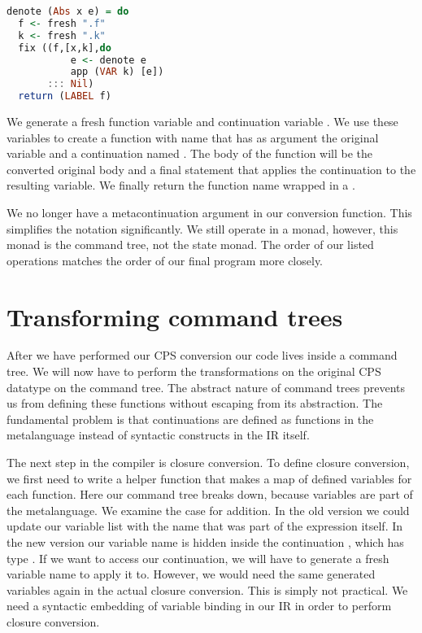 \begin{lstlisting}[language=Haskell]
denote (Abs x e) = do
  f <- fresh ".f"
  k <- fresh ".k"
  fix ((f,[x,k],do
           e <- denote e
           app (VAR k) [e])
       ::: Nil)
  return (LABEL f)
\end{lstlisting}

We generate a fresh function variable  and continuation variable . We use these variables to create a function with name  that has as argument the original variable and a continuation named . The body of the function will be the converted original body and a final statement that applies the continuation to the resulting variable. We finally return the function name wrapped in a .

We no longer have a metacontinuation argument in our conversion function. This simplifies the notation significantly. We still operate in a monad, however, this monad is the command tree, not the state monad. The order of our listed operations matches the order of our final program more closely.


\section{\label{section:transcomtree}Transforming command trees}
After we have performed our \ac{CPS} conversion our code lives inside a command tree. We will now have to perform the transformations on the original \ac{CPS} datatype on the command tree. The abstract nature of command trees prevents us from defining these functions without escaping from its abstraction. The fundamental problem is that continuations are defined as functions in the metalanguage instead of syntactic constructs in the \ac{IR} itself.

The next step in the compiler is closure conversion. To define closure conversion, we first need to write a helper function that makes a map of defined variables for each function. Here our command tree breaks down, because variables are part of the metalanguage. We examine the case for addition. In the old version we could update our variable list with the name  that was part of the  expression itself. In the new version our variable name is hidden inside the continuation , which has type . If we want to access our continuation, we will have to generate a fresh variable name to apply it to. However, we would need the same generated variables again in the actual closure conversion. This is simply not practical. We need a syntactic embedding of variable binding in our \ac{IR} in order to perform closure conversion.

